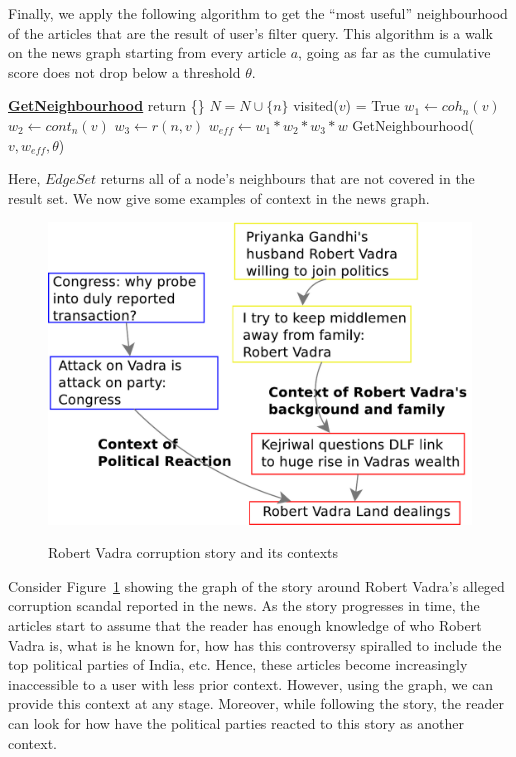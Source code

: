 Finally, we apply the following algorithm to get the ``most useful'' neighbourhood of the articles that are the result of user's filter query. This algorithm is a walk on the news graph starting from every article $a$, 
going as far as the cumulative score does not drop below a threshold $\theta$.

\begin{algorithmic}
  \State \textbf{\underline{GetNeighbourhood}}
  \State {}
  \State {}
      \State return \{\}
    \EndIf
    \State $N = N\cup\{n\}$
        \State visited($v$) = True
        \State $w_1 \leftarrow coh_{n}(v)$
        \State $w_2 \leftarrow cont_{n}(v)$
        \State $w_3 \leftarrow r(n,v)$
        \State $w_{eff} \leftarrow w_1 * w_2 * w_3 * w$
        \State GetNeighbourhood($v, w_{eff}, \theta$)
      \EndIf
    \EndFor
\end{algorithmic}

Here, $EdgeSet$ returns all of a node's neighbours that are not covered in the result set. We now give some examples of context in the news graph.
\begin{figure}
\caption{Robert Vadra corruption story and its contexts}
\includegraphics[scale=0.36]{figures/graph-vadra.pdf}
\label{fig:vadra-corruption}
\end{figure}

Consider Figure~\ref{fig:vadra-corruption} showing the graph of the story around Robert Vadra's alleged
corruption scandal reported in the news. As the story progresses in time, the articles
start to assume that the reader has enough knowledge of who Robert Vadra is, what is he known for,
how has this controversy spiralled to include the top political parties of India, etc. Hence, these articles
become increasingly inaccessible to a user with less prior context. However, 
using the graph, we can provide this context at any stage. Moreover, while following the story, 
the reader can look for how have the political parties reacted to this story as another context.

